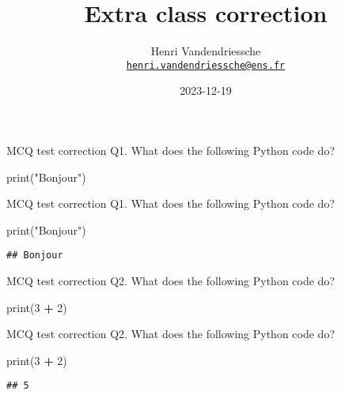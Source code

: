 \documentclass[
  8pt,
  ignorenonframetext,
]{beamer}
\title{Extra class correction}
\author{Henri Vandendriessche\\
\href{mailto:henri.vandendriessche@ens.fr}{\nolinkurl{henri.vandendriessche@ens.fr}}}
\date{2023-12-19}
\newenvironment{Shaded}{\begin{snugshade}}{\end{snugshade}}
\newcommand{\BuiltInTok}[1]{#1}
\newcommand{\DecValTok}[1]{\textcolor[rgb]{0.00,0.00,0.81}{#1}}
\newcommand{\NormalTok}[1]{#1}
\newcommand{\OperatorTok}[1]{\textcolor[rgb]{0.81,0.36,0.00}{\textbf{#1}}}
\newcommand{\StringTok}[1]{\textcolor[rgb]{0.31,0.60,0.02}{#1}}
\begin{document}
\frame{\titlepage}

\begin{frame}[fragile]{MCQ test correction}
\protect\hypertarget{mcq-test-correction}{}
Q1. What does the following Python code do?

\begin{Shaded}
\begin{Highlighting}[]
\BuiltInTok{print}\NormalTok{(}\StringTok{"Bonjour"}\NormalTok{)}
\end{Highlighting}
\end{Shaded}
\end{frame}

\begin{frame}[fragile]{MCQ test correction}
\protect\hypertarget{mcq-test-correction-1}{}
Q1. What does the following Python code do?

\begin{Shaded}
\begin{Highlighting}[]
\BuiltInTok{print}\NormalTok{(}\StringTok{"Bonjour"}\NormalTok{)}
\end{Highlighting}
\end{Shaded}

\begin{verbatim}
## Bonjour
\end{verbatim}
\end{frame}

\begin{frame}[fragile]{MCQ test correction}
\protect\hypertarget{mcq-test-correction-2}{}
Q2. What does the following Python code do?

\begin{Shaded}
\begin{Highlighting}[]
\BuiltInTok{print}\NormalTok{(}\DecValTok{3} \OperatorTok{+} \DecValTok{2}\NormalTok{)}
\end{Highlighting}
\end{Shaded}
\end{frame}

\begin{frame}[fragile]{MCQ test correction}
\protect\hypertarget{mcq-test-correction-3}{}
Q2. What does the following Python code do?

\begin{Shaded}
\begin{Highlighting}[]
\BuiltInTok{print}\NormalTok{(}\DecValTok{3} \OperatorTok{+} \DecValTok{2}\NormalTok{)}
\end{Highlighting}
\end{Shaded}

\begin{verbatim}
## 5
\end{verbatim}
\end{frame}
\end{document}
